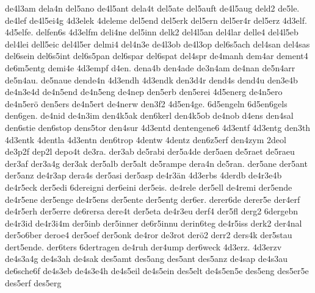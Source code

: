 {    de4l3am
    dela4n
    del5ano
    de4l5ant
    dela4t
    del5ate
    del5auft
    de4l5aug
    deld2
    de5le.
    de4lef
    de4l5ei4g
    4d3elek
    4deleme
    del5end
    del5erk
    del5ern
    del5er4r
    del5erz
    4d3elf.
    4d5elfe.
    delfen6s
    4d3elfm
    deli4ne
    del5inn
    delk2
    del4l5an
    del4lar
    delle4
    del4l5eb
    del4lei
    dell5eic
    del4l5er
    delmi4
    del4n3e
    de4l3ob
    de4l3op
    del6s5ach
    del4san
    del4sas
    del6sein
    del6s5int
    del6s5pan
    del6spar
    del6spat
    del4spr
    de4manh
    dem4ar
    dement4
    de6m5entg
    demi4e
    4d3empf
    d4en.
    dena4b
    den4ade
    de3n4am
    de4nan
    de5n4arr
    de5n4au.
    de5naue
    dende4n
    4d3endh
    4d3endk
    den3d4r
    dend4s
    dend4u
    den3e4b
    de4n3e4d
    de4n5end
    de4n5eng
    de4nep
    den5erb
    den5erei
    4d5energ
    de4n5ero
    de4n5erö
    den5ers
    de4n5ert
    de4nerw
    den3f2
    4d5en4ge.
    6d5engeln
    6d5en6gels
    den6gen.
    de4nid
    de4n3im
    den4k5ak
    den6kerl
    den4k5ob
    de4nob
    d4ens
    den4sal
    den6stie
    den6stop
    dens5tor
    den4sur
    4d3entd
    dentengene6
    4d3entf
    4d3entg
    den3th
    4d3entk
    4dentla
    4d3entn
    den6trop
    4dentw
    4dentz
    den6z5erf
    den4zym
    2deol
    de3p2f
    dep2l
    depo4t
    de3ra.
    der3ab
    de5rabi
    der5a4de
    der5aen
    de5raet
    de5raeu
    der3af
    der3a4g
    der3ak
    der5alb
    der5alt
    de5rampe
    dera4n
    de5ran.
    der5ane
    der5ant
    der5anz
    de4r3ap
    dera4s
    der5asi
    der5asp
    de4r3än
    4d3erbs
    4derdb
    de4r3e4b
    de4r5eck
    der5edi
    6dereigni
    der6eini
    der5eis.
    de4rele
    der5ell
    de4remi
    der5ende
    de4r5ene
    der5enge
    de4r5ens
    der5ente
    der5entg
    der6er.
    derer6de
    derer5e
    der4erf
    de4r5erh
    der5erre
    de6rersa
    dere4t
    der5eta
    de4r3eu
    derf4
    der5fl
    derg2
    6dergebn
    de4r3id
    de4r3i4m
    der5inb
    der5inner
    de6r5innu
    derin6teg
    de4r5iss
    derk2
    der4nal
    der5o6ber
    deroe4
    der5oef
    der5onk
    de4ror
    de3rot
    derö2
    derr2
    ders4k
    der5stau
    dert5ende.
    der6ters
    6dertragen
    de4ruh
    der4ump
    der6weck
    4d3erz.
    4d3erzv
    de4s3a4g
    de4s3ah
    de4sak
    des5amt
    des5ang
    des5ant
    des5anz
    de4sap
    de4s3au
    de6sche6f
    de4s3eb
    de4s3e4h
    de4s5eil
    de4s5ein
    des5elt
    de4s5en5e
    des5eng
    des5er5e
    des5erf
    des5erg
}
